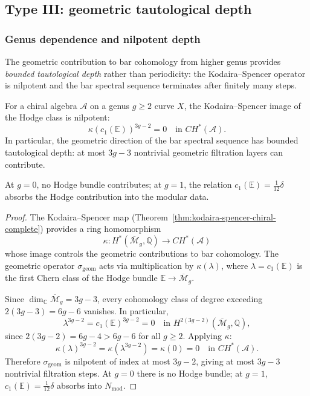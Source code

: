 \subsection{Type III: geometric tautological depth}

\subsubsection{Genus dependence and nilpotent depth}

The geometric contribution to bar cohomology from higher genus provides \emph{bounded tautological depth} rather than periodicity: the Kodaira--Spencer operator is nilpotent and the bar spectral sequence terminates after finitely many steps.

\begin{theorem}
\label{thm:geometric-periodicity-weak}
For a chiral algebra $\mathcal{A}$ on a genus $g \geq 2$ curve $X$,
the Kodaira--Spencer image of the Hodge class is nilpotent:
\[
\kappa(c_1(\mathbb{E}))^{3g-2} = 0
\quad \text{in } CH^*(\mathcal{A}).
\]
In particular, the geometric direction of the bar spectral sequence
has bounded tautological depth: at most $3g - 3$ nontrivial geometric
filtration layers can contribute.

At $g = 0$, no Hodge bundle contributes; at $g = 1$, the relation
$c_1(\mathbb{E}) = \frac{1}{12}\delta$ absorbs the Hodge
contribution into the modular data.
\end{theorem}

\begin{proof}
The Kodaira--Spencer map (Theorem~\ref{thm:kodaira-spencer-chiral-complete}) provides a ring homomorphism
\[
\kappa \colon H^*(\overline{\mathcal{M}}_g, \mathbb{Q}) \longrightarrow CH^*(\mathcal{A})
\]
whose image controls the geometric contributions to bar cohomology.
The geometric operator $\sigma_{\mathrm{geom}}$ acts via
multiplication by $\kappa(\lambda)$, where
$\lambda = c_1(\mathbb{E})$ is the first Chern class of the Hodge
bundle $\mathbb{E} \to \overline{\mathcal{M}}_g$.

Since $\dim_{\mathbb{C}} \overline{\mathcal{M}}_g = 3g - 3$, every cohomology class of degree exceeding $2(3g-3) = 6g - 6$ vanishes.  In particular,
\[
\lambda^{3g-2} = c_1(\mathbb{E})^{3g-2} = 0 \quad \text{in } H^{2(3g-2)}(\overline{\mathcal{M}}_g, \mathbb{Q}),
\]
since $2(3g-2) = 6g - 4 > 6g - 6$ for all $g \geq 2$.  Applying $\kappa$:
\[
\kappa(\lambda)^{3g-2} = \kappa(\lambda^{3g-2}) = \kappa(0) = 0 \quad \text{in } CH^*(\mathcal{A}).
\]
Therefore $\sigma_{\mathrm{geom}}$ is nilpotent of index at most $3g - 2$, giving at most $3g - 3$ nontrivial filtration steps.  At $g = 0$ there is no Hodge bundle; at $g = 1$, $c_1(\mathbb{E}) = \frac{1}{12}\delta$ absorbs into $N_{\mathrm{mod}}$.
\end{proof}

